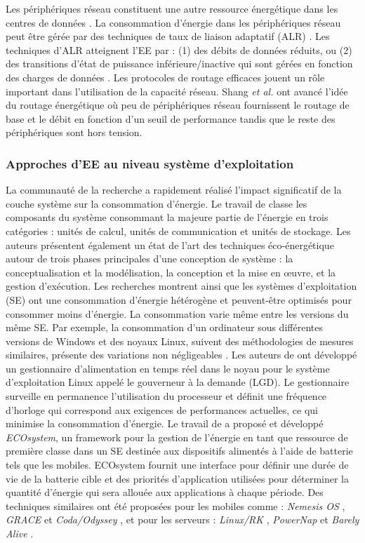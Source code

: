 Les périphériques réseau constituent une autre ressource énergétique dans les centres de données \cite{Orgerie14}. La consommation d'énergie dans les périphériques réseau peut être gérée par des techniques de taux de liaison adaptatif (ALR) \cite{Bilal13,Bilal14}. Les techniques d'ALR atteignent l'EE par : (1) des débits de données réduits, ou (2) des transitions d'état de puissance inférieure/inactive qui sont gérées en fonction des charges de données \cite{Bilal13b}. Les protocoles de routage efficaces jouent un rôle important dans l'utilisation de la capacité réseau. Shang \textit{et al.} \cite{Shang10} ont avancé l'idée du routage énergétique où peu de périphériques réseau fournissent le routage de base et le débit en fonction d'un seuil de performance tandis que le reste des périphériques sont hors tension.

\subsubsection{Approches d'EE au niveau système d'exploitation}
La communauté de la recherche a rapidement réalisé l'impact significatif de la couche système sur la consommation d'énergie. Le travail de \cite{Benini00} classe les composants du système consommant la majeure partie de l'énergie en trois catégories : unités de calcul, unités de communication et unités de stockage. Les auteurs présentent également un état de l'art des techniques éco-énergétique autour de trois phases principales d'une conception de système : la conceptualisation et la modélisation, la conception et la mise en œuvre, et la gestion d'exécution. Les recherches montrent ainsi que les systèmes d'exploitation (SE) ont une consommation d'énergie hétérogène et peuvent-être optimisés pour consommer moins d'énergie. La consommation varie même entre les versions du même SE. Par exemple, la consommation d'un ordinateur sous différentes versions de Windows et des noyaux Linux, suivent des méthodologies de mesures similaires, présente des variations non négligeables \cite{Orgerie14}. Les auteurs de \cite{Pallipadi06} ont développé un gestionnaire d'alimentation en temps réel dans le noyau pour le système d'exploitation Linux appelé le gouverneur à la demande (LGD). Le gestionnaire surveille en permanence l'utilisation du processeur et définit une fréquence d'horloge qui correspond aux exigences de performances actuelles, ce qui minimise la consommation d'énergie. Le travail de \cite{Zeng02} a proposé et développé \textit{ECOsystem}, un framework pour la gestion de l'énergie en tant que ressource de première classe dans un SE destinée aux dispositifs alimentés à l'aide de batterie tels que les mobiles. ECOsystem fournit une interface pour définir une durée de vie de la batterie cible et des priorités d'application utilisées pour déterminer la quantité d'énergie qui sera allouée aux applications à chaque période. Des techniques similaires ont été proposées pour les mobiles comme : \textit{Nemesis OS} \cite{Neugebauer01}, \textit{GRACE} \cite{Sachs04,Vardhan09} et \textit{Coda/Odyssey} \cite{Flinn04}, et pour les serveurs : \textit{Linux/RK} \cite{Rajkumar97}, \textit{PowerNap} \cite{Meisner09} et \textit{Barely Alive} \cite{Anagnostopoulou12}.

